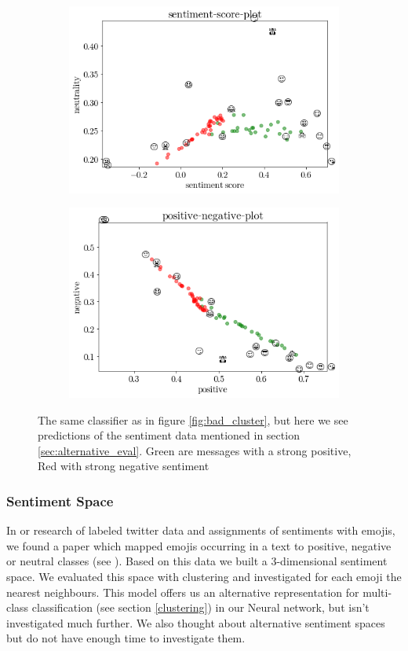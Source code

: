 \documentclass{article}
\begin{document}
\begin{figure}[h]
\centering
\begin{subfigure}{0.49\textwidth}
\centering
\includegraphics[width=0.9\linewidth]{images/sentiment-sn-plot.png}
\end{subfigure}
\begin{subfigure}{0.49\textwidth}
\centering
\includegraphics[width=0.9\linewidth]{images/sentiment-pn-plot.png}
\end{subfigure}
\caption{The same classifier as in figure \ref{fig:bad_cluster}, but here we see predictions of the sentiment data mentioned in section \ref{sec:alternative_eval}. Green are messages with a strong positive, Red with strong negative sentiment}
\label{fig:good_cluster}
\end{figure}

\subsubsection{Sentiment Space}
In or research of labeled twitter data and assignments of sentiments with emojis, we found a paper  which mapped  emojis occurring in a text to positive, negative or neutral classes (see \citep{novak2015}). Based on this data we built a 3-dimensional sentiment space. We evaluated this space with clustering and investigated for each emoji the nearest neighbours. This model offers us an alternative representation for multi-class classification (see section \ref{clustering}) in our Neural network, but isn't investigated much further. We also thought about alternative sentiment spaces but do not have enough time to investigate them. 
\end{document}
